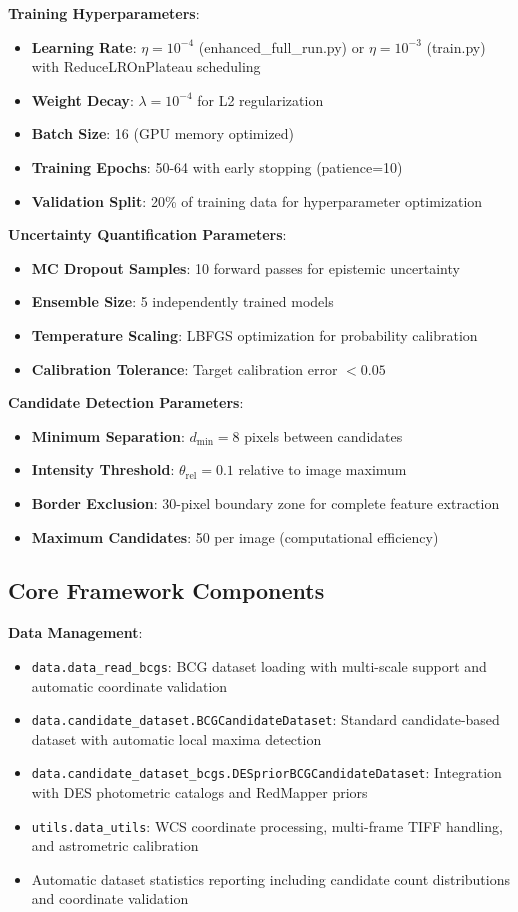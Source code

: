\documentclass[twocolumn,10pt]{aastex631}
\begin{document}
\textbf{Training Hyperparameters}:
\begin{itemize}
\item \textbf{Learning Rate}: $\eta = 10^{-4}$ (enhanced\_full\_run.py) or $\eta = 10^{-3}$ (train.py) with ReduceLROnPlateau scheduling
\item \textbf{Weight Decay}: $\lambda = 10^{-4}$ for L2 regularization
\item \textbf{Batch Size}: 16 (GPU memory optimized)
\item \textbf{Training Epochs}: 50-64 with early stopping (patience=10)
\item \textbf{Validation Split}: 20\% of training data for hyperparameter optimization
\end{itemize}

\textbf{Uncertainty Quantification Parameters}:
\begin{itemize}
\item \textbf{MC Dropout Samples}: 10 forward passes for epistemic uncertainty
\item \textbf{Ensemble Size}: 5 independently trained models
\item \textbf{Temperature Scaling}: LBFGS optimization for probability calibration
\item \textbf{Calibration Tolerance}: Target calibration error $< 0.05$
\end{itemize}

\textbf{Candidate Detection Parameters}:
\begin{itemize}
\item \textbf{Minimum Separation}: $d_{\text{min}} = 8$ pixels between candidates
\item \textbf{Intensity Threshold}: $\theta_{\text{rel}} = 0.1$ relative to image maximum
\item \textbf{Border Exclusion}: 30-pixel boundary zone for complete feature extraction
\item \textbf{Maximum Candidates}: 50 per image (computational efficiency)
\end{itemize}

\subsection{Core Framework Components}

\textbf{Data Management}:
\begin{itemize}
\item \texttt{data.data\_read\_bcgs}: BCG dataset loading with multi-scale support and automatic coordinate validation
\item \texttt{data.candidate\_dataset.BCGCandidateDataset}: Standard candidate-based dataset with automatic local maxima detection
\item \texttt{data.candidate\_dataset\_bcgs.DESpriorBCGCandidateDataset}: Integration with DES photometric catalogs and RedMapper priors
\item \texttt{utils.data\_utils}: WCS coordinate processing, multi-frame TIFF handling, and astrometric calibration
\item Automatic dataset statistics reporting including candidate count distributions and coordinate validation
\end{itemize}
\end{document}
